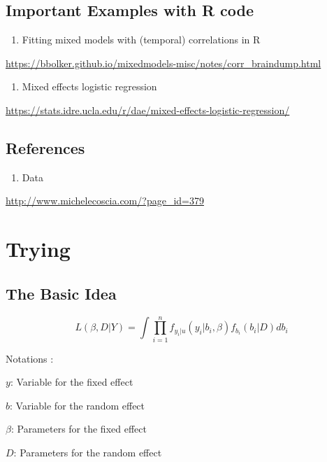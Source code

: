 \documentclass[]{book}
\providecommand{\tightlist}{%
  \setlength{\itemsep}{0pt}\setlength{\parskip}{0pt}}
\begin{document}
\section{Important Examples with R
code}\label{important-examples-with-r-code}

\begin{enumerate}
\def\labelenumi{\arabic{enumi}.}
\tightlist
\item
  Fitting mixed models with (temporal) correlations in R
\end{enumerate}

\url{https://bbolker.github.io/mixedmodels-misc/notes/corr_braindump.html}

\begin{enumerate}
\def\labelenumi{\arabic{enumi}.}
\setcounter{enumi}{1}
\tightlist
\item
  Mixed effects logistic regression
\end{enumerate}

\url{https://stats.idre.ucla.edu/r/dae/mixed-effects-logistic-regression/}

\section{References}\label{references-1}

\begin{enumerate}
\def\labelenumi{\arabic{enumi}.}
\tightlist
\item
  Data
\end{enumerate}

\url{http://www.michelecoscia.com/?page_id=379}

\chapter{Trying}\label{trying}

\section{The Basic Idea}\label{the-basic-idea}

\[L(\beta,D|Y)=\int \prod_{i=1}^{n} f_{y_i|u}(y_i|b_i,\beta)f_{b_i}(b_i|D)db_i\]

Notations :

\(y\): Variable for the fixed effect

\(b\): Variable for the random effect

\(\beta\): Parameters for the fixed effect

\(D\): Parameters for the random effect
\end{document}
